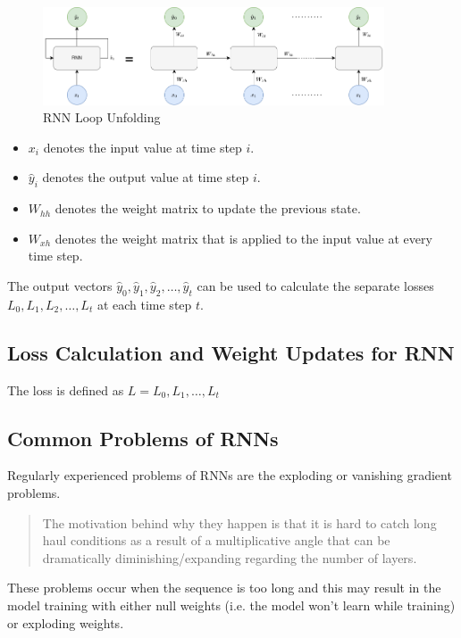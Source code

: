             \begin{figure}[h!]
                \centering
                \includegraphics[width=0.90\textwidth]{figures/rnn_loop_unfolding.drawio.png}
                \caption{RNN Loop Unfolding}
                \label{fig:rnn-loop-unfolding}
            \end{figure}
            \begin{itemize}[label=\textemdash]
                \item $x_i$ denotes the input value at time step $i$.
                \item $\hat{y}_i$ denotes the output value at time step $i$.
                \item $W_{hh}$ denotes the weight matrix to update the previous state.
                \item $W_{xh}$ denotes the weight matrix that is applied to the input value at every time step.
            \end{itemize}
            The output vectors $\hat{y}_0, \hat{y}_1, \hat{y}_2, \dots, \hat{y}_t$ can be used to calculate the separate losses $L_0, L_1, L_2, \dots, L_t$ at each time step $t$.

        \subsection{Loss Calculation and Weight Updates for RNN}
        \label{sec:loss-calculation-and-weight-updates-for-rnn-background}

            The loss is defined as $L = L_0, L_1, \dots, L_t$

        \subsection{Common Problems of RNNs}
        \label{sec:shortcomings-of-rnns-background}

            Regularly experienced problems of RNNs are the exploding or vanishing gradient problems.
            \begin{quote}
                The motivation behind why they happen is that it is hard to catch long haul conditions as a result of a multiplicative angle that can be dramatically diminishing/expanding regarding the number of layers. \cite{parikhDisadvantagesRNN2021}
            \end{quote}
            These problems occur when the sequence is too long and this may result in the model training with either null weights (i.e. the model won't learn while training) or exploding weights.
            
